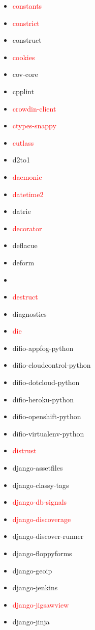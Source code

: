 \documentclass{l4proj}
\begin{document}
\begin{appendices}
{\begin{itemize}
\item\textcolor{red}{constants}
\item\textcolor{red}{constrict}
\item construct
\item\textcolor{red}{cookies}
\item cov-core
\item cpplint
\item\textcolor{red}{crowdin-client}
\item\textcolor{red}{ctypes-snappy}
\item\textcolor{red}{cutlass}
\item d2to1
\item\textcolor{red}{daemonic}
\end{itemize}
}%
\noindent\parbox[t]{0.32\textwidth}{\raggedright%
\begin{itemize}
\item\textcolor{red}{datetime2}
\item datrie
\item\textcolor{red}{decorator}
\item deflacue
\item deform
\item {}
\item\textcolor{red}{destruct}
\item diagnostics
\item\textcolor{red}{die}
\item difio-appfog-python
\item difio-cloudcontrol-python
\item difio-dotcloud-python
\item difio-heroku-python
\item difio-openshift-python
\item difio-virtualenv-python
\item\textcolor{red}{distrust}
\item django-assetfiles
\item django-classy-tags
\item\textcolor{red}{django-db-signals}
\item\textcolor{red}{django-discoverage}
\item django-discover-runner
\item django-floppyforms
\item django-geoip
\item django-jenkins
\item\textcolor{red}{django-jigsawview}
\item django-jinja

\end{itemize}}
\end{appendices}
\end{document}
